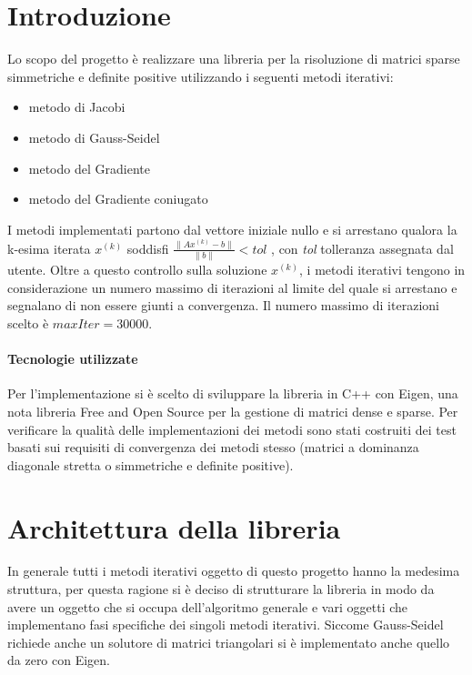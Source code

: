 \documentclass[a4paper,11pt,oneside, table]{article}
\begin{document}
    \printindex
    \tableofcontents
    \renewcommand{\baselinestretch}{1.5}

\section{Introduzione}

Lo scopo del progetto \`e realizzare una libreria per la risoluzione di matrici sparse simmetriche e definite positive utilizzando i seguenti metodi iterativi:

\begin{itemize}
    \item metodo di Jacobi
    \item metodo di Gauss-Seidel
    \item metodo del Gradiente
    \item metodo del Gradiente coniugato
\end{itemize}

I metodi implementati partono dal vettore iniziale nullo e si arrestano qualora la k-esima iterata $x^{(k)}$ soddisfi $\frac{\parallel Ax^{(k)}-b \parallel} {\parallel b \parallel} < tol$ , con \textit{tol} tolleranza assegnata dal utente. Oltre a questo controllo sulla soluzione $x^{(k)}$, i metodi iterativi tengono in considerazione un numero massimo di iterazioni al limite del quale si arrestano e segnalano di non essere giunti a convergenza. Il numero massimo di iterazioni scelto \`e $maxIter = 30000$.

\paragraph{Tecnologie utilizzate}

Per l'implementazione si \`e scelto di sviluppare la libreria in C++ con Eigen, una nota libreria Free and Open Source per la gestione di  matrici dense e sparse. Per verificare la qualit\`a delle implementazioni dei metodi sono stati costruiti dei test basati sui requisiti di convergenza dei metodi stesso (matrici a dominanza diagonale stretta o simmetriche e definite positive).

\section{Architettura della libreria}

In generale tutti i metodi iterativi oggetto di questo progetto hanno la medesima struttura, per questa ragione si \`e deciso di strutturare la libreria in modo da avere un oggetto che si occupa dell'algoritmo generale e vari oggetti che implementano fasi specifiche dei singoli metodi iterativi. Siccome Gauss-Seidel richiede anche un solutore di matrici triangolari si \`e implementato anche quello da zero con Eigen.
\end{document}
